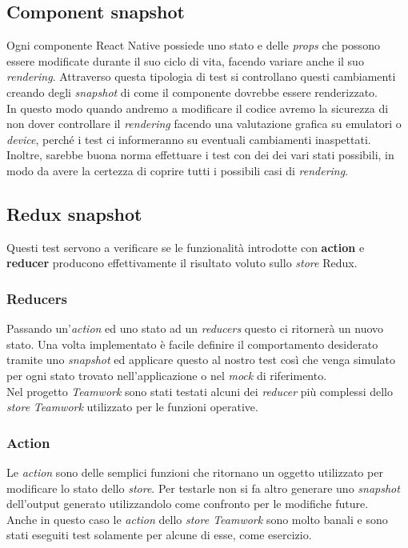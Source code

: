 \subsection{Component snapshot}
Ogni componente React Native possiede uno stato e delle \emph{props} che possono essere modificate durante il suo ciclo di vita, facendo variare anche il suo \emph{rendering}. Attraverso questa tipologia di test si controllano questi cambiamenti creando degli \emph{snapshot} di come il componente dovrebbe essere renderizzato. \\
In questo modo quando andremo a modificare il codice avremo la sicurezza di non dover controllare il \emph{rendering} facendo una valutazione grafica su emulatori o \emph{device}, perché i test ci informeranno su eventuali cambiamenti inaspettati. \\
Inoltre, sarebbe buona norma effettuare i test con dei  dei vari stati possibili, in modo da avere la certezza di coprire tutti i possibili casi di \emph{rendering}.

\subsection{Redux snapshot}
Questi test servono a verificare se le funzionalità introdotte con \textbf{action} e \textbf{reducer} producono effettivamente il risultato voluto sullo \emph{store} Redux. \\
\subsubsection{Reducers}
Passando un'\emph{action} ed uno stato ad un \emph{reducers} questo ci ritornerà un nuovo stato. Una volta implementato è facile definire il comportamento desiderato tramite uno \emph{snapshot} ed applicare questo al nostro test così che venga simulato per ogni stato trovato nell'applicazione o nel \emph{mock} di riferimento. \\
Nel progetto \emph{Teamwork} sono stati testati alcuni dei \emph{reducer} più complessi dello \emph{store} \emph{Teamwork} utilizzato per le funzioni operative.\\

\subsubsection{Action}
Le \emph{action} sono delle semplici funzioni che ritornano un oggetto utilizzato per modificare lo stato dello \emph{store}. Per testarle non si fa altro generare uno \emph{snapshot} dell'output generato utilizzandolo come confronto per le modifiche future. \\
Anche in questo caso le \emph{action} dello \emph{store Teamwork} sono molto banali e sono stati eseguiti test solamente per alcune di esse, come esercizio.


